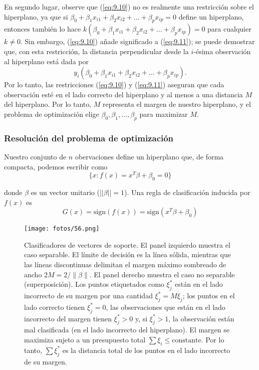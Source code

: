 En segundo lugar, observe que (\ref{eq:9.10}) no es realmente una restricción sobre el hiperplano, ya que si $\beta_0 + \beta_1 x_{i1} + \beta_2 x_{i2} + \ldots + \beta_p x_{ip} = 0$ define un hiperplano, entonces también lo hace $k (\beta_0 + \beta_1 x_{i1} + \beta_2 x_{i2} + \ldots + \beta_p x_{ip}) = 0$ para cualquier $k \neq 0$. Sin embargo, (\ref{eq:9.10}) añade significado a (\ref{eq:9.11}); se puede demostrar que, con esta restricción, la distancia perpendicular desde la $i$-ésima observación al hiperplano está dada por
\begin{equation}
y_i (\beta_0 + \beta_1 x_{i1} + \beta_2 x_{i2} + \ldots + \beta_p x_{ip}).
\end{equation}
Por lo tanto, las restricciones (\ref{eq:9.10}) y (\ref{eq:9.11}) aseguran que cada observación esté en el lado correcto del hiperplano y al menos a una distancia $M$ del hiperplano. Por lo tanto, $M$ representa el margen de nuestro hiperplano, y el problema de optimización elige $\beta_0, \beta_1, \ldots, \beta_p$ para maximizar $M$. 

\subsubsection{Resolución del problema de optimización}

Nuestro conjunto de $n$ obervaciones define un hiperplano que, de forma compacta, podemos escribir como 
\begin{equation}
\{x: f(x) = x^T \beta + \beta_0 = 0\}
\end{equation}

\noindent donde $\beta$ es un vector unitario ($||\beta|| = 1$). Una regla de clasificación inducida por $f(x)$ es 
\begin{equation}
G(x) = \text{sign}(f(x)) = \text{sign}(x^T \beta + \beta_0)
\end{equation}

\begin{figure}[h]
\centering
\texttt{[image: fotos/56.png]}
\caption{Clasificadores de vectores de soporte. El panel izquierdo muestra el caso separable. El límite de decisión es la línea sólida, mientras que las líneas discontinuas delimitan el margen máximo sombreado de ancho $2M = 2/\|\beta\|$. El panel derecho muestra el caso no separable (superposición). Los puntos etiquetados como $\xi^*_j$ están en el lado incorrecto de su margen por una cantidad $\xi^*_j = M \xi_j$; los puntos en el lado correcto tienen $\xi^*_j = 0$, las observaciones que están en el lado incorrecto del margen tienen $\xi_j^* > 0$ y, si $\xi_j^* > 1$, la observación están mal clasificada (en el lado incorrecto del hiperplano). El margen se maximiza sujeto a un presupuesto total $\sum \xi_i \leq \text{constante}$. Por lo tanto, $\sum \xi^*_j$ es la distancia total de los puntos en el lado incorrecto de su margen.}
\label{fig:12.1}
\end{figure}

